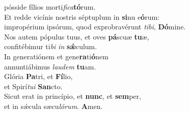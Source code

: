 \evenverse pósside fílios morti\textit{fi}\textit{ca}\textbf{tó}rum.\\
\oddverse Et redde vicínis nostris séptuplum in \textbf{si}nu e\textbf{ó}rum:~\*\\
\oddverse impropérium ipsórum, quod exprobravérunt \textit{ti}\textit{bi}, \textbf{Dó}mine.\\
\evenverse Nos autem pópulus tuus, et oves \textbf{pá}scuæ \textbf{tu}æ,~\*\\
\evenverse confitébimur ti\textit{bi} \textit{in} \textbf{sǽ}culum.\\
\oddverse In generatiónem et gene\textbf{ra}ti\textbf{ó}nem~\*\\
\oddverse annuntiábimus \textit{lau}\textit{dem} \textbf{tu}am.\\
\evenverse Glória \textbf{Pa}tri, et \textbf{Fí}lio,~\*\\
\evenverse et Spirí\textit{tu}\textit{i} \textbf{San}cto.\\
\oddverse Sicut erat in princípio, et \textbf{nunc}, et \textbf{sem}per,~\*\\
\oddverse et in sǽcula sæcu\textit{ló}\textit{rum}. \textbf{A}men.\\
